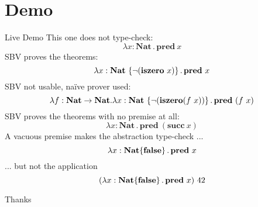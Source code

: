 \documentclass[handout]{beamer}
\begin{document}
\section{Demo}

\begin{frame}[allowframebreaks]{Live Demo}
    This one does not type-check:
    \[
        \lambda x : \textbf{Nat} \operatorname. \textbf{pred} \ x
    \]
    SBV proves the theorems:
    \[
        \lambda x : \textbf{Nat} \ \qty{\neg (\textbf{iszero} \ x)} \operatorname. \textbf{pred} \ x
    \]
    SBV not usable, na\"ive prover used:
    \[
        \lambda f : \textbf{Nat} \to \textbf{Nat} . \lambda x : \textbf{Nat} \ \qty{\neg(\textbf{iszero} (f \ x))} \operatorname. \textbf{pred} \ (f \ x)
    \]
    SBV proves the theorems with no premise at all:
    \[
        \lambda x : \textbf{Nat} \operatorname. \textbf{pred} \ (\textbf{succ} \ x)
    \]
    A vacuous premise makes the abstraction type-check ...
    \[
        \lambda x : \textbf{Nat} \qty{\textbf{false}} \operatorname. \textbf{pred} \ x
    \]
    ... but not the application
    \[
        (\lambda x : \textbf{Nat} \qty{\textbf{false}} \operatorname. \textbf{pred} \ x) \ 42
    \]
\end{frame}

\appendix

\begin{frame}[standout]
Thanks
\end{frame}
\end{document}
